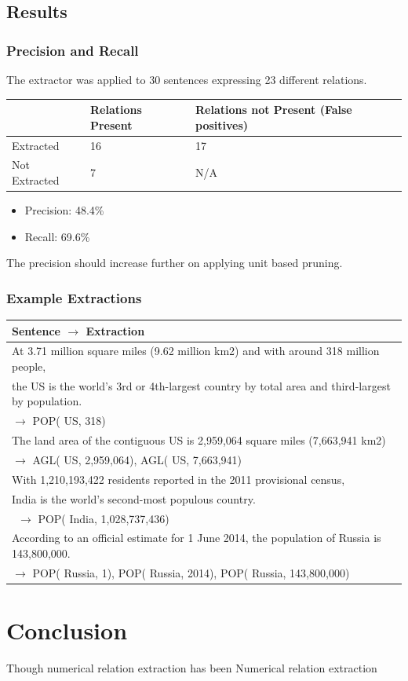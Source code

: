\documentclass[a4paper,10pt]{article}
\begin{document}
\subsection{Results}
\subsubsection{Precision and Recall}
The extractor was applied to 30 sentences expressing 23 different relations.
\begin{tabular}{|l|l|l|}
\hline
& Relations Present & Relations not Present (False positives) \\
\hline
Extracted & 16 & 17 \\
\hline
Not Extracted & 7 & N/A \\
\hline
\end{tabular}
 \begin{itemize}
  \item Precision: 48.4\%
  \item Recall: 69.6\%
 \end{itemize}

The precision should increase further on applying unit based pruning.

\subsubsection{Example Extractions}
\begin{tabular}{|l|} 
\hline
Sentence $\rightarrow$ Extraction \\
\hline
At 3.71 million square miles (9.62 million km2) and with around 318 million people,\\ 
the US is the world's 3rd or 4th-largest country by total area and third-largest by population. \\$\rightarrow$ POP( US, 318) \\
\hline
The land area \cite{hoffmann2011knowledge} of the contiguous US is 2,959,064 square miles (7,663,941 km2)\\ $\rightarrow$  AGL( US, 2,959,064), AGL( US, 7,663,941) \\
\hline
With 1,210,193,422 residents reported in the 2011 provisional census,\\ 
India is the world's second-most populous country.\\\ $\rightarrow$ POP( India, 1,028,737,436)\\ 
\hline
According to an official estimate for 1 June 2014, the population of Russia is 143,800,000.\\ $\rightarrow$
POP( Russia, 1), POP( Russia, 2014), POP( Russia, 143,800,000) \\
\hline
\end{tabular}

\section{Conclusion}
Though numerical relation extraction has been Numerical relation extraction 
%


\printbibliography[title=References]
\end{document}
